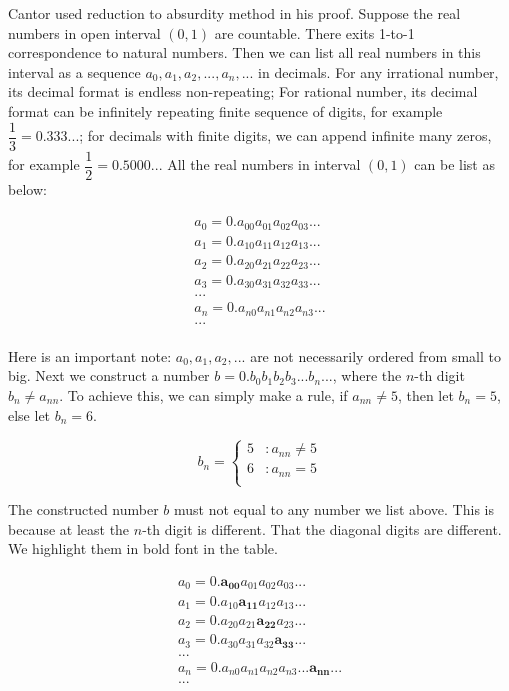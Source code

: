 \documentclass{article}
\begin{document}
Cantor used reduction to absurdity method in his proof. Suppose the real numbers in open interval $(0, 1)$ are countable. There exits 1-to-1 correspondence to natural numbers. Then we can list all real numbers in this interval as a sequence $a_0, a_1, a_2, ..., a_n, ...$ in decimals. For any irrational number, its decimal format is endless non-repeating; For rational number, its decimal format can be infinitely repeating finite sequence of digits, for example $\dfrac{1}{3} = 0.333...$; for decimals with finite digits, we can append infinite many zeros, for example $\dfrac{1}{2} = 0.5000...$ All the real numbers in interval $(0, 1)$ can be list as below:

\[
\begin{array}{l}
a_0 = 0.a_{00}a_{01}a_{02}a_{03}...\\
a_1 = 0.a_{10}a_{11}a_{12}a_{13}...\\
a_2 = 0.a_{20}a_{21}a_{22}a_{23}...\\
a_3 = 0.a_{30}a_{31}a_{32}a_{33}...\\
... \\
a_n = 0.a_{n0}a_{n1}a_{n2}a_{n3}...\\
... \\
\end{array}
\]

Here is an important note: $a_0, a_1, a_2, ...$ are not necessarily ordered from small to big. Next we construct a number $b = 0.b_0b_1b_2b_3...b_n...$, where the $n$-th digit $b_n \neq a_{nn}$. To achieve this, we can simply make a rule, if $a_{nn} \neq 5$, then let $b_n = 5$, else let $b_n = 6$.

\[
b_n = \begin{cases}
5 & : a_{nn} \neq 5 \\
6 & : a_{nn} = 5 \\
\end{cases}
\]

The constructed number $b$ must not equal to any number we list above. This is because at least the $n$-th digit is different. That the diagonal digits are different. We highlight them in bold font in the table.

\[
\begin{array}{l}
a_0 = 0.\pmb{a_{00}}a_{01}a_{02}a_{03}...\\
a_1 = 0.a_{10}\pmb{a_{11}}a_{12}a_{13}...\\
a_2 = 0.a_{20}a_{21}\pmb{a_{22}}a_{23}...\\
a_3 = 0.a_{30}a_{31}a_{32}\pmb{a_{33}}...\\
... \\
a_n = 0.a_{n0}a_{n1}a_{n2}a_{n3}...\pmb{a_{nn}}...\\
... \\
\end{array}
\]
\end{document}
